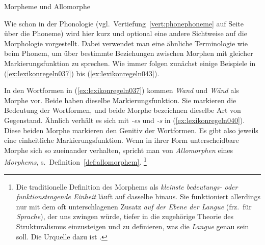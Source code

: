 \begin{Vertiefung}{Morpheme und Allomorphe}

\label{vert:morphemeallomorphe}

\noindent Wie schon in der Phonologie (vgl.\ Vertiefung~\ref{vert:phonephoneme} auf Seite~\pageref{vert:phonephoneme} über die Phoneme) wird hier kurz und optional eine andere Sichtweise auf die Morphologie vorgestellt.
Dabei verwendet man eine ähnliche Terminologie wie beim Phonem, um über bestimmte Beziehungen zwischen Morphen mit gleicher Markierungsfunktion zu sprechen.
Wie immer folgen zunächst einige Beispiele in (\ref{ex:lexikonregeln037}) bis (\ref{ex:lexikonregeln043}).

\begin{exe}
  \ex\label{ex:lexikonregeln037}
  \begin{xlist}
  \end{xlist}
  \ex\label{ex:lexikonregeln040}
  \begin{xlist}
  \end{xlist}
  \ex\label{ex:lexikonregeln043}
  \begin{xlist}
  \end{xlist}
\end{exe}

In den Wortformen in (\ref{ex:lexikonregeln037}) kommen \textit{Wand} und \textit{Wänd} als Morphe vor.
Beide haben dieselbe Markierungsfunktion.
Sie markieren die Bedeutung der Wortformen, und beide Morphe bezeichnen dieselbe Art von Gegenstand.
Ähnlich verhält es sich mit \textit{-es} und \textit{-s} in (\ref{ex:lexikonregeln040}).
Diese beiden Morphe markieren den Genitiv der Wortformen.
Es gibt also jeweils eine einheitliche Markierungsfunktion.
Wenn in ihrer Form unterscheidbare Morphe sich so zueinander verhalten, spricht man von \textit{Allomorphen} eines \textit{Morphems}, s.\ Definition~\ref{def:allomorphem}.%
\footnote{Die traditionelle Definition des Morphems als \textit{kleinste bedeutungs- oder funktionstragende Einheit} läuft auf dasselbe hinaus.
Sie funktioniert allerdings nur mit dem oft unterschlagenen Zusatz \textit{auf der Ebene der Langue} (frz.\ für \textit{Sprache}), der uns zwingen würde, tiefer in die zugehörige Theorie des Strukturalismus einzusteigen und zu definieren, was die \textit{Langue} genau sein soll.
Die Urquelle dazu ist \citet{Saussure2013}.}


\end{Vertiefung}
